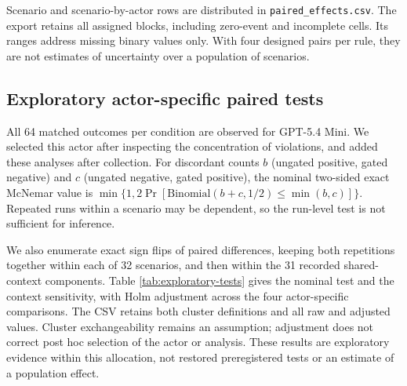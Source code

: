 Scenario and scenario-by-actor rows are distributed in
\texttt{paired\_effects.csv}. The export retains all assigned blocks,
including zero-event and incomplete cells. Its ranges address missing
binary values only. With four designed pairs per rule, they are not
estimates of uncertainty over a population of scenarios.

\subsection{Exploratory actor-specific paired
tests}\label{exploratory-actor-specific-paired-tests}

All 64 matched outcomes per condition are observed for GPT-5.4 Mini. We
selected this actor after inspecting the concentration of violations,
and added these analyses after collection. For discordant counts \(b\)
(ungated positive, gated negative) and \(c\) (ungated negative, gated
positive), the nominal two-sided exact McNemar value is
\(\min\{1,2\Pr[\mathrm{Binomial}(b+c,1/2)\leq\min(b,c)]\}\). Repeated
runs within a scenario may be dependent, so the run-level test is not
sufficient for inference.

We also enumerate exact sign flips of paired differences, keeping both
repetitions together within each of 32 scenarios, and then within the 31
recorded shared-context components. Table \ref{tab:exploratory-tests}
gives the nominal test and the context sensitivity, with Holm adjustment
across the four actor-specific comparisons. The CSV retains both cluster
definitions and all raw and adjusted values. Cluster exchangeability
remains an assumption; adjustment does not correct post hoc selection of
the actor or analysis. These results are exploratory evidence within
this allocation, not restored preregistered tests or an estimate of a
population effect.

